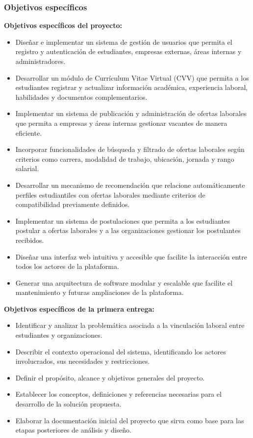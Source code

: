 \documentclass[11pt,a4paper]{Plantilla}
\begin{document}
\subsubsection{Objetivos específicos}%
\textbf{Objetivos específicos del proyecto:}
\begin{itemize}
    \item Diseñar e implementar un sistema de gestión de usuarios que permita el registro y autenticación de estudiantes, empresas externas, áreas internas y administradores.

    \item Desarrollar un módulo de Currículum Vitae Virtual (CVV) que permita a los estudiantes registrar y actualizar información académica, experiencia laboral, habilidades y documentos complementarios.
    \item Implementar un sistema de publicación y administración de ofertas laborales que permita a empresas y áreas internas gestionar vacantes de manera eficiente.
    \item Incorporar funcionalidades de búsqueda y filtrado de ofertas laborales según criterios como carrera, modalidad de trabajo, ubicación, jornada y rango salarial.
    \item Desarrollar un mecanismo de recomendación que relacione automáticamente perfiles estudiantiles con ofertas laborales mediante criterios de compatibilidad previamente definidos.
    \item Implementar un sistema de postulaciones que permita a los estudiantes postular a ofertas laborales y a las organizaciones gestionar los postulantes recibidos.
    \item Diseñar una interfaz web intuitiva y accesible que facilite la interacción entre todos los actores de la plataforma.
    \item Generar una arquitectura de software modular y escalable que facilite el mantenimiento y futuras ampliaciones de la plataforma.
\end{itemize}

\textbf{Objetivos específicos de la primera entrega:}
\begin{itemize}
    \item Identificar y analizar la problemática asociada a la vinculación laboral entre estudiantes y organizaciones.
    
    \item Describir el contexto operacional del sistema, identificando los actores involucrados, sus necesidades y restricciones.

    \item Definir el propósito, alcance y objetivos generales del proyecto.

    \item Establecer los conceptos, definiciones y referencias necesarias para el desarrollo de la solución propuesta.

    \item Elaborar la documentación inicial del proyecto que sirva como base para las etapas posteriores de análisis y diseño.
\end{itemize}
\end{document}
